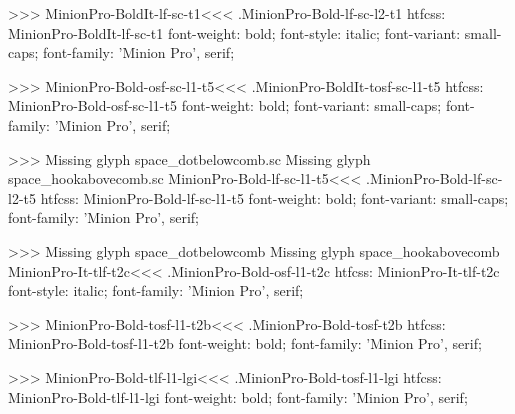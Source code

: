 {>>>
\<MinionPro-BoldIt-lf-sc-t1\><<<
.MinionPro-Bold-lf-sc-l2-t1
htfcss:  MinionPro-BoldIt-lf-sc-t1  font-weight: bold; font-style: italic; font-variant: small-caps; font-family: 'Minion Pro', serif;

>>>
\<MinionPro-Bold-osf-sc-l1-t5\><<<
.MinionPro-BoldIt-tosf-sc-l1-t5
htfcss:  MinionPro-Bold-osf-sc-l1-t5  font-weight: bold; font-variant: small-caps; font-family: 'Minion Pro', serif;

>>>
Missing glyph	space_dotbelowcomb.sc
Missing glyph	space_hookabovecomb.sc
\<MinionPro-Bold-lf-sc-l1-t5\><<<
.MinionPro-Bold-lf-sc-l2-t5
htfcss:  MinionPro-Bold-lf-sc-l1-t5  font-weight: bold; font-variant: small-caps; font-family: 'Minion Pro', serif;

>>>
Missing glyph	space_dotbelowcomb
Missing glyph	space_hookabovecomb
\<MinionPro-It-tlf-t2c\><<<
.MinionPro-Bold-osf-l1-t2c
htfcss:  MinionPro-It-tlf-t2c  font-style: italic; font-family: 'Minion Pro', serif;

>>>
\<MinionPro-Bold-tosf-l1-t2b\><<<
.MinionPro-Bold-tosf-t2b
htfcss:  MinionPro-Bold-tosf-l1-t2b  font-weight: bold; font-family: 'Minion Pro', serif;

>>>
\<MinionPro-Bold-tlf-l1-lgi\><<<
.MinionPro-Bold-tosf-l1-lgi
htfcss:  MinionPro-Bold-tlf-l1-lgi  font-weight: bold; font-family: 'Minion Pro', serif;

}
